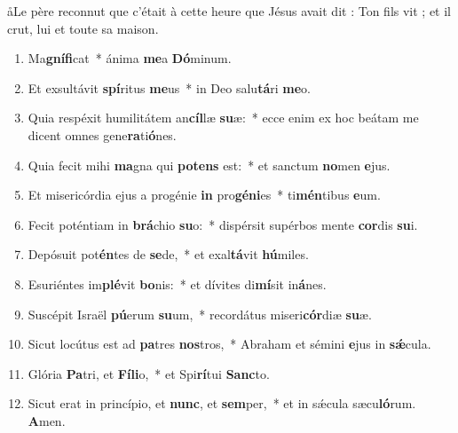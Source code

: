 \documentclass[twoside]{article}
\begin{document}
\begin{paracol}[1]{2}
\aa Le père reconnut que c’était à cette heure que Jésus avait dit : Ton fils vit ; et il crut, lui et toute sa maison.


\switchcolumn*

\begin{enumerate}[wide, itemsep=0mm, labelwidth=!, labelindent=0pt, label=\color{gregoriocolor}\theenumi]

\item Ma\textbf{gní}\textbf{fi}cat~* ánima \textbf{me}a \textbf{Dó}minum.
\item Et exsultávit \textbf{spí}ritus \textbf{me}us~* in Deo salu\textbf{tá}ri \textbf{me}o.
\item Quia respéxit humilitátem an\textbf{cíl}læ \textbf{su}æ:~* ecce enim ex hoc beátam me dicent omnes gene\textbf{ra}ti\textbf{ó}nes.
\item Quia fecit mihi \textbf{ma}gna qui \textbf{pot}\textbf{ens} est:~* et sanctum \textbf{no}men \textbf{e}jus.
\item Et misericórdia ejus a progénie \textbf{in} pro\textbf{gé}\textbf{ni}es~* ti\textbf{mén}tibus \textbf{e}um.
\item Fecit poténtiam in \textbf{brá}chio \textbf{su}o:~* dispérsit supérbos mente \textbf{cor}dis \textbf{su}i.
\item Depósuit pot\textbf{én}tes de \textbf{se}de,~* et exal\textbf{tá}vit \textbf{hú}miles.
\item Esuriéntes im\textbf{plé}vit \textbf{bo}nis:~* et dívites di\textbf{mí}sit in\textbf{á}nes.
\item Suscépit Israël \textbf{pú}erum \textbf{su}um,~* recordátus miseri\textbf{cór}diæ \textbf{su}æ.
\item Sicut locútus est ad \textbf{pa}tres \textbf{nos}tros,~* Abraham et sémini \textbf{e}jus in \textbf{sǽ}cula.
\item Glória \textbf{Pa}tri, et \textbf{Fí}\textbf{li}o,~* et Spi\textbf{rí}tui \textbf{Sanc}to.
\item Sicut erat in princípio, et \textbf{nunc}, et \textbf{sem}per,~* et in sǽcula sæcu\textbf{ló}rum. \textbf{A}men.

\end{enumerate}


\end{paracol}
\end{document}
